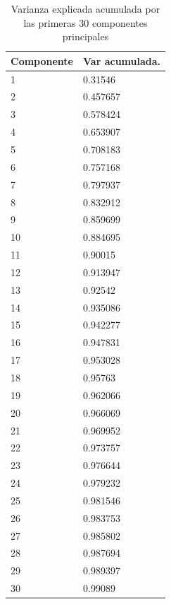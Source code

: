 \documentclass[journal]{IEEEtran}
\begin{document}
\begin{table}[ht!]
\caption{Varianza explicada acumulada por las primeras 30 componentes principales}
\label{table:pca_results}
\centering
\begin{tabular}{l | l }
Componente & Var acumulada.  \\
\hline
 1  &  0.31546  \\
 2  &  0.457657  \\
 3  &  0.578424  \\
 4  &  0.653907  \\
 5  &  0.708183  \\
 6  &  0.757168  \\
 7  &  0.797937  \\
 8  &  0.832912  \\
 9  &  0.859699  \\
10  &  0.884695  \\
11  &  0.90015  \\
12  &  0.913947  \\
13  &  0.92542  \\
14  &  0.935086  \\
15  &  0.942277  \\
16  &  0.947831  \\
17  &  0.953028  \\
18  &  0.95763  \\
19  &  0.962066  \\
20  &  0.966069  \\
21  &  0.969952  \\
22  &  0.973757  \\
23  &  0.976644  \\
24  &  0.979232  \\
25  &  0.981546  \\
26  &  0.983753  \\
27  &  0.985802  \\
28  &  0.987694  \\
29  &  0.989397  \\
30  &  0.99089  \\
\end{tabular}
\end{table}
\end{document}
